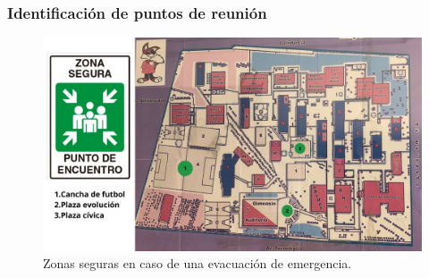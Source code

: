     
    \subsubsection{Identificación de puntos de reunión}
    
    \begin{figure}[H]
        \centering
        \includegraphics[scale=0.15]{34/img/puntosDeReunion.png}
        \caption{Zonas seguras en caso de una evacuación de emergencia.}
        \label{fig:puntosDeReunion}
    \end{figure}
    
